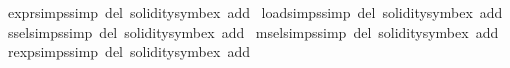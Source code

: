 \begin{isabellebody}
\endisatagproof
{\isafoldproof}%
%
\isadelimproof
%
\endisadelimproof
\isanewline
\isanewline
{}\isamarkupfalse%
\ expr{\isachardot}{\kern0pt}simps{\isacharbrackleft}{\kern0pt}simp\ del{\isacharcomma}{\kern0pt}\ solidity{\isacharunderscore}{\kern0pt}symbex\ add{\isacharbrackright}{\kern0pt}\isanewline
{}\isamarkupfalse%
\ load{\isachardot}{\kern0pt}simps{\isacharbrackleft}{\kern0pt}simp\ del{\isacharcomma}{\kern0pt}\ solidity{\isacharunderscore}{\kern0pt}symbex\ add{\isacharbrackright}{\kern0pt}\isanewline
{}\isamarkupfalse%
\ ssel{\isachardot}{\kern0pt}simps{\isacharbrackleft}{\kern0pt}simp\ del{\isacharcomma}{\kern0pt}\ solidity{\isacharunderscore}{\kern0pt}symbex\ add{\isacharbrackright}{\kern0pt}\isanewline
{}\isamarkupfalse%
\ msel{\isachardot}{\kern0pt}simps{\isacharbrackleft}{\kern0pt}simp\ del{\isacharcomma}{\kern0pt}\ solidity{\isacharunderscore}{\kern0pt}symbex\ add{\isacharbrackright}{\kern0pt}\isanewline
{}\isamarkupfalse%
\ rexp{\isachardot}{\kern0pt}simps{\isacharbrackleft}{\kern0pt}simp\ del{\isacharcomma}{\kern0pt}\ solidity{\isacharunderscore}{\kern0pt}symbex\ add{\isacharbrackright}{\kern0pt}\isanewline
\isanewline
{}\isamarkupfalse%
\isanewline
%
\isadelimtheory
\isanewline
%
\endisadelimtheory
%
\isatagtheory
{}\isamarkupfalse%
%
\endisatagtheory
{\isafoldtheory}%
%
\isadelimtheory
%
\endisadelimtheory
%
\end{isabellebody}%
\endinput
